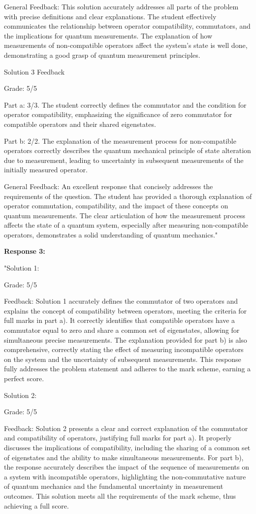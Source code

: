 \documentclass[a4paper,11pt]{article}
\begin{document}
General Feedback: This solution accurately addresses all parts of the problem with precise definitions and clear explanations. The student effectively communicates the relationship between operator compatibility, commutators, and the implications for quantum measurements. The explanation of how measurements of non-compatible operators affect the system's state is well done, demonstrating a good grasp of quantum measurement principles.

Solution 3 Feedback

Grade: 5/5

Part a: 3/3. The student correctly defines the commutator and the condition for operator compatibility, emphasizing the significance of zero commutator for compatible operators and their shared eigenstates.

Part b: 2/2. The explanation of the measurement process for non-compatible operators correctly describes the quantum mechanical principle of state alteration due to measurement, leading to uncertainty in subsequent measurements of the initially measured operator.

General Feedback: An excellent response that concisely addresses the requirements of the question. The student has provided a thorough explanation of operator commutation, compatibility, and the impact of these concepts on quantum measurements. The clear articulation of how the measurement process affects the state of a quantum system, especially after measuring non-compatible operators, demonstrates a solid understanding of quantum mechanics."

\textbf{Response 3:}

"Solution 1:

Grade: 5/5

Feedback: Solution 1 accurately defines the commutator of two operators and explains the concept of compatibility between operators, meeting the criteria for full marks in part a). It correctly identifies that compatible operators have a commutator equal to zero and share a common set of eigenstates, allowing for simultaneous precise measurements. The explanation provided for part b) is also comprehensive, correctly stating the effect of measuring incompatible operators on the system and the uncertainty of subsequent measurements. This response fully addresses the problem statement and adheres to the mark scheme, earning a perfect score.

Solution 2:

Grade: 5/5

Feedback: Solution 2 presents a clear and correct explanation of the commutator and compatibility of operators, justifying full marks for part a). It properly discusses the implications of compatibility, including the sharing of a common set of eigenstates and the ability to make simultaneous measurements. For part b), the response accurately describes the impact of the sequence of measurements on a system with incompatible operators, highlighting the non-commutative nature of quantum mechanics and the fundamental uncertainty in measurement outcomes. This solution meets all the requirements of the mark scheme, thus achieving a full score.
\end{document}
